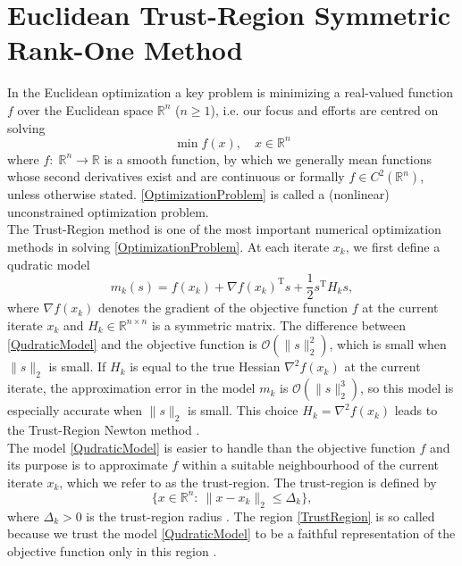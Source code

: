 \chapter{Euclidean Trust-Region Symmetric Rank-One Method}

In the Euclidean optimization a key problem is minimizing a real-valued function $f$ over the Euclidean space $\mathbb{R}^n$ ($n \geq 1$), i.e. our focus and efforts are centred on solving 
\begin{equation}\label{OptimizationProblem}
    \min f(x), \quad x \in \mathbb{R}^n
\end{equation}  
where $f \colon \; \mathbb{R}^n \to \mathbb{R}$ is a smooth function, by which we generally mean functions whose second derivatives exist and are continuous or formally $f \in C^2(\mathbb{R}^n)$, unless otherwise stated. \cref{OptimizationProblem} is called a (nonlinear) unconstrained optimization problem. \\
The Trust-Region method is one of the most important numerical optimization methods in solving \cref{OptimizationProblem}. At each iterate $x_k$, we first define a qudratic model 
\begin{equation}\label{QudraticModel}
    m_k(s) = f(x_k) + \nabla f(x_k)^{\mathrm{T}} s + \frac{1}{2} s^{\mathrm{T}} H_k s,
\end{equation}
where $\nabla f(x_k)$ denotes the gradient of the objective function $f$ at the current iterate $x_k$ and $H_k \in  \mathbb{R}^{n \times n}$ is a symmetric matrix. The difference between \cref{QudraticModel} and the objective function is $\mathcal{O}(\lVert s \rVert^{2}_2)$, which is small when $\lVert s \rVert_2$ is small. If $H_k$ is equal to the true Hessian $\nabla^2 f(x_k)$ at the current iterate, the approximation error in the model $m_k$ is $\mathcal{O}(\lVert s \rVert^{3}_2)$, so this model is especially accurate when $\lVert s \rVert_2$ is small. This choice $H_k = \nabla^2 f(x_k)$ leads to the Trust-Region Newton method \cite[p.~68]{NocedalWright:2006}. \\
The model \cref{QudraticModel} is easier to handle than the objective function $f$ and its purpose is to approximate $f$ within a suitable neighbourhood of the current iterate $x_k$, which we refer to as the trust-region. The trust-region is defined by
\begin{equation}\label{TrustRegion}
    \{ x \in \mathbb{R}^n \colon \ \lVert x - x_k \rVert_2 \leq \Delta_k \},
\end{equation}
where $\Delta_k > 0$ is the trust-region radius \cite[p.~115]{ConnGouldToint:2000}. The region \cref{TrustRegion} is so called because we trust the model \cref{QudraticModel} to be a faithful representation of the objective function only in this region \cite[p.~2]{ConnGouldToint:2000}. \\
